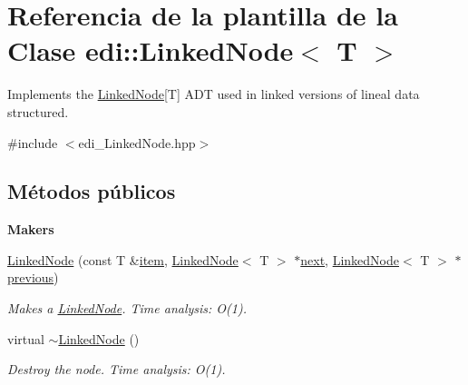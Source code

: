 \hypertarget{classedi_1_1LinkedNode}{\section{Referencia de la plantilla de la Clase edi\+:\+:Linked\+Node$<$ T $>$}
\label{classedi_1_1LinkedNode}
}


Implements the \hyperlink{classedi_1_1LinkedNode}{Linked\+Node}\mbox{[}T\mbox{]} A\+D\+T used in linked versions of lineal data structured.  




{\ttfamily \#include $<$edi\+\_\+\+Linked\+Node.\+hpp$>$}

\subsection*{Métodos públicos}
\begin{Indent}{\bf Makers}\par
\begin{DoxyCompactItemize}
\item 
\hyperlink{classedi_1_1LinkedNode_ac8ab79928976f8db2c45755b8196367e}{Linked\+Node} (const T \&\hyperlink{classedi_1_1LinkedNode_aac54788675e672b5a9ae85a83890dda8}{item}, \hyperlink{classedi_1_1LinkedNode}{Linked\+Node}$<$ T $>$ $\ast$\hyperlink{classedi_1_1LinkedNode_a86170b1d8ac57d1cf1833582ee20d430}{next}, \hyperlink{classedi_1_1LinkedNode}{Linked\+Node}$<$ T $>$ $\ast$\hyperlink{classedi_1_1LinkedNode_aa3dff6aa75b3f2a61d2f3f63a7e56298}{previous})
\begin{DoxyCompactList}\small\item\em Makes a \hyperlink{classedi_1_1LinkedNode}{Linked\+Node}. Time analysis\+: O(1). \end{DoxyCompactList}\item 
virtual \hyperlink{classedi_1_1LinkedNode_aee708775de333c7127dd318f9ce86749}{$\sim$\+Linked\+Node} ()
\begin{DoxyCompactList}\small\item\em Destroy the node. Time analysis\+: O(1). \end{DoxyCompactList}\end{DoxyCompactItemize}
\end{Indent}
